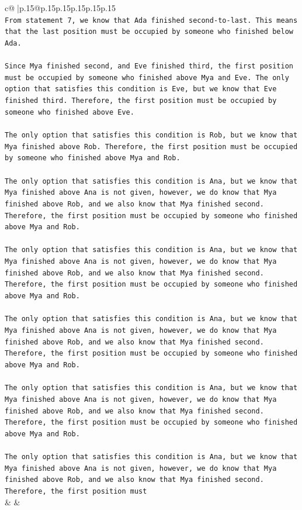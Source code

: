 \documentclass{article}
\begin{document}
{\begin{supertabular}{c@{$\;$}|p{.15\linewidth}@{}p{.15\linewidth}p{.15\linewidth}p{.15\linewidth}p{.15\linewidth}p{.15\linewidth}}
{{{\\ 
\texttt{From statement 7, we know that Ada finished second{-}to{-}last. This means that the last position must be occupied by someone who finished below Ada.} \\
\\ 
\texttt{Since Mya finished second, and Eve finished third, the first position must be occupied by someone who finished above Mya and Eve. The only option that satisfies this condition is Eve, but we know that Eve finished third. Therefore, the first position must be occupied by someone who finished above Eve.} \\
\\ 
\texttt{The only option that satisfies this condition is Rob, but we know that Mya finished above Rob. Therefore, the first position must be occupied by someone who finished above Mya and Rob.} \\
\\ 
\texttt{The only option that satisfies this condition is Ana, but we know that Mya finished above Ana is not given, however, we do know that Mya finished above Rob, and we also know that Mya finished second. Therefore, the first position must be occupied by someone who finished above Mya and Rob.} \\
\\ 
\texttt{The only option that satisfies this condition is Ana, but we know that Mya finished above Ana is not given, however, we do know that Mya finished above Rob, and we also know that Mya finished second. Therefore, the first position must be occupied by someone who finished above Mya and Rob.} \\
\\ 
\texttt{The only option that satisfies this condition is Ana, but we know that Mya finished above Ana is not given, however, we do know that Mya finished above Rob, and we also know that Mya finished second. Therefore, the first position must be occupied by someone who finished above Mya and Rob.} \\
\\ 
\texttt{The only option that satisfies this condition is Ana, but we know that Mya finished above Ana is not given, however, we do know that Mya finished above Rob, and we also know that Mya finished second. Therefore, the first position must be occupied by someone who finished above Mya and Rob.} \\
\\ 
\texttt{The only option that satisfies this condition is Ana, but we know that Mya finished above Ana is not given, however, we do know that Mya finished above Rob, and we also know that Mya finished second. Therefore, the first position must} \\
            }
        }
    }
    & & \\ \\


\end{supertabular}}
\end{document}
